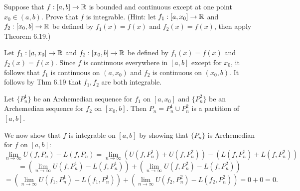 \documentclass[letterpaper, twoside, 12pt]{book}
\begin{document}
\begin{exercise}[Section 6.4 \#8]
  Suppose that \(f:[a,b]\to\mathbb R\) is bounded and continuous except
  at one point \(x_0\in(a,b)\). Prove that \(f\) is integrable.
  (Hint: let \(f_1:[a,x_0]\to\mathbb R\) and \(f_2:[x_0,b]\to\mathbb R\)
  be defined by \(f_1(x)=f(x)\) and \(f_2(x)=f(x)\), then apply
  Theorem 6.19.)
\end{exercise}
\begin{solution}
  Let \(f_1:[a,x_0]\to\mathbb R\) and \(f_2:[x_0,b]\to\mathbb R\)
  be defined by \(f_1(x)=f(x)\) and \(f_2(x)=f(x)\).
  Since \(f\) is continuous everywhere in \([a,b]\) except for \(x_0\),
  it follows that \(f_1\) is continuous on \((a,x_0)\) and
  \(f_2\) is continuous on \((x_0,b)\). It follows by Thm 6.19
  that \(f_1,f_2\) are both integrable.

  Let \(\{P_n^1\}\) be an Archemedian sequence for
  \(f_1\) on \([a,x_0]\) and
  \(\{P_n^2\}\) be an Archemedian sequence for \(f_2\) on \([x_0,b]\).
  Then \(P_n=P_n^1\cup P_n^2\) is a partition of \([a,b]\).

  We now show that \(f\) is integrable on \([a,b]\)
  by showing that \(\{P_n\}\)
  is Archemedian for \(f\) on \([a,b]\):
    \[
      \lim_{n\to\infty} U(f,P_n)-L(f,P_n)
        =
      \lim_{n\to\infty}
        (U(f,P_n^1)+U(f,P_n^2))
          -
        (L(f,P_n^1)+L(f,P_n^2))
    \]
    \[
        =
      \left(\lim_{n\to\infty} U(f,P_n^1)-L(f,P_n^1)\right)
        +
      \left(\lim_{n\to\infty} U(f,P_n^2)-L(f,P_n^2)\right)
    \]
    \[
        =
      \left(\lim_{n\to\infty} U(f_1,P_n^1)-L(f_1,P_n^1)\right)
        +
      \left(\lim_{n\to\infty} U(f_2,P_n^2)-L(f_2,P_n^2)\right)
        =
      0 + 0 = 0
    .\]
\end{solution}
\end{document}
